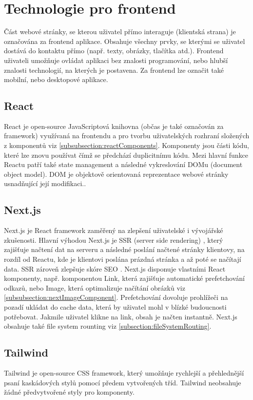 \documentclass[12pt, a4paper,
 twoside,        %
 openright
]{report}
\begin{document}
\section{Technologie pro frontend}
Část webové stránky, se kterou uživatel přímo interaguje (klientská strana) je označována za frontend aplikace. Obsahuje všechny prvky, se kterými se uživatel dostává do kontaktu přímo (např. texty, obrázky, tlačítka atd.). Frontend uživateli umožňuje ovládat aplikaci bez znalosti programování, nebo hlubší znalosti technologií, na kterých je postavena. Za frontend lze označit také mobilní, nebo desktopové aplikace. \cite{whatIsFrontend}

\subsection{React}
React je open-source JavaScriptová knihovna (občas je také označován za framework) využívaná na frontendu a pro tvorbu uživatelských rozhraní složených z komponentů viz \ref{subsubsection:reactComponents}. Komponenty jsou části kódu, které lze znovu používat čímž se předchází duplicitnímu kódu. Mezi hlavní funkce Reactu patří také state management a následné vykreslování DOMu (document object model). DOM je objektově orientovaná reprezentace webové stránky usnadňující její modifikaci.\cite{reactComponentsAndProps}. \cite{gettingStartedReact}
\subsection{Next.js}
Next.js je React framework zaměřený na zlepšení uživatelské i vývojářské zkušenosti. Hlavní výhodou Next.js je SSR (server side rendering) \cite{whatIsSSR}, který zajišťuje načtení dat na serveru a následné poslání načtené stránky klientovy, na rozdíl od Reactu, kde je klientovi poslána prázdná stránka a až poté se načítají data. SSR zároveň zlepšuje skóre SEO \cite{whatIsSEO}. Next.js disponuje vlastními React komponenty, např. komponentou Link, která zajišťuje automatické prefetchování odkazů, nebo Image, která optimalizuje načítání obrázků viz \ref{subsubsection:nextImageComponent}. Prefetchování dovoluje prohlížeči na pozadí ukládat do cache data, která by uživatel mohl v blízké budoucnosti potřebovat. Jakmile uživatel klikne na link, obsah je načten instantně. Next.js obsahuje také file system rounting viz \ref{subsection:fileSystemRouting}. \cite{nextGetStarted}
\subsection{Tailwind}
Tailwind je open-source CSS framework, který umožňuje rychlejší a přehlednější psaní kaskádových stylů pomocí předem vytvořených tříd. Tailwind neobsahuje žádné předvytvořené styly pro komponenty. \cite{tailwindDocumentation}
\end{document}
